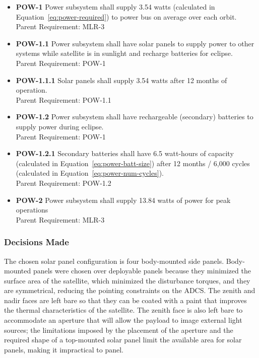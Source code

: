 \documentclass[12pt]{article}
\begin{document}
			\begin{itemize}
				\item \textbf{POW-1}  Power subsystem shall supply 3.54 watts (calculated in Equation~\ref{eq:power-required}) to power bus on average over each orbit.
				\\
				Parent Requirement: MLR-3
				\item \textbf{POW-1.1}  Power subsystem shall have solar panels to supply power to other systems while satellite is in sunlight and recharge batteries for eclipse.
				\\
				Parent Requirement: POW-1
				\item \textbf{POW-1.1.1}  Solar panels shall supply 3.54 watts after 12 months of operation.
				\\
				Parent Requirement: POW-1.1
				\item \textbf{POW-1.2}  Power subsystem shall have rechargeable (secondary) batteries to supply power during eclipse.
				\\
				Parent Requirement: POW-1
				\item \textbf{POW-1.2.1}  Secondary batteries shall have 6.5 watt-hours of capacity (calculated in Equation~\ref{eq:power-batt-size}) after 12 months / 6,000 cycles (calculated in Equation~\ref{eq:power-num-cycles}).
				\\
				Parent Requirement: POW-1.2
				\item \textbf{POW-2}  Power subsystem shall supply 13.84 watts of power for peak operations
				\\
				Parent Requirement: MLR-3
			\end{itemize}
			
			\subsubsection{Decisions Made}
			
			The chosen solar panel configuration is four body-mounted side panels.  Body-mounted panels were chosen over deployable panels because they minimized the surface area of the satellite, which minimized the disturbance torques, and they are symmetrical, reducing the pointing constraints on the ADCS.  The zenith and nadir faces are left bare so that they can be coated with a paint that improves the thermal characteristics of the satellite.  The zenith face is also left bare to accommodate an aperture that will allow the payload to image external light sources; the limitations imposed by the placement of the aperture and the required shape of a top-mounted solar panel limit the available area for solar panels, making it impractical to panel.
\end{document}

